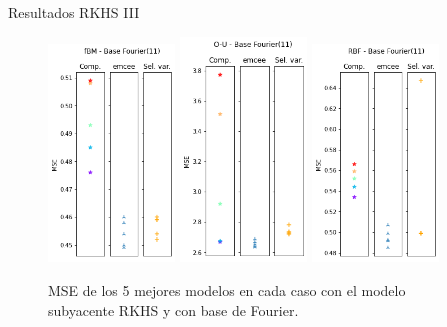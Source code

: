 \documentclass[10pt, spanish, professionalfonts]{beamer}
\begin{document}
\begin{frame}{Resultados RKHS III}
  \begin{figure}
    \includegraphics[width=0.3\textwidth]{img/results/lin_rkhs_fbm_base11}\hfill
    \includegraphics[width=0.3\textwidth]{img/results/lin_rkhs_ou_base11}\hfill
    \includegraphics[width=0.3\textwidth]{img/results/lin_rkhs_rbf_base11}
    \caption{MSE de los 5 mejores modelos en cada caso con el modelo subyacente RKHS y con base de Fourier.}
  \end{figure}
\end{frame}
\end{document}
